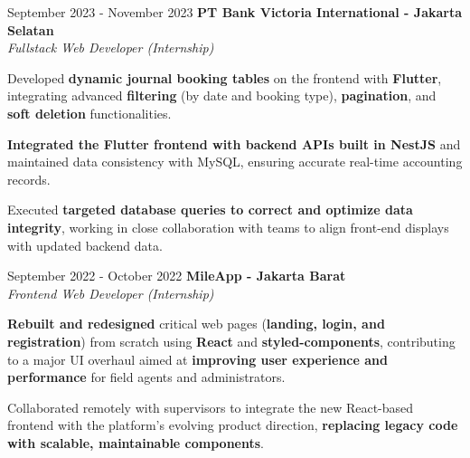 \documentclass[../main.tex]{subfiles}
\begin{document}
\vspace{0.40 cm}

\begin{twocolentry}{September 2023 - November 2023}
    \textbf{PT Bank Victoria International \color{Gray}- Jakarta Selatan}\\
    \textit{Fullstack Web Developer (Internship)}
\end{twocolentry}

\vspace{0.10 cm}
\begin{onecolentry}
\begin{highlights}
    \item Developed \textbf{dynamic journal booking tables} on the frontend with \textbf{Flutter}, integrating advanced \textbf{filtering} (by date and booking type), \textbf{pagination}, and \textbf{soft deletion} functionalities.
    \item \textbf{Integrated the Flutter frontend with backend APIs built in NestJS} and maintained data consistency with MySQL, ensuring accurate real-time accounting records.
    \item Executed \textbf{targeted database queries to correct and optimize data integrity}, working in close collaboration with teams to align front-end displays with updated backend data.
\end{highlights}
\end{onecolentry}

\vspace{0.40 cm}

\begin{twocolentry}{September 2022 - October 2022}
    \textbf{MileApp \color{Gray}- Jakarta Barat}\\
    \textit{Frontend Web Developer (Internship)}
\end{twocolentry}

\vspace{0.10 cm}
\begin{onecolentry}
\begin{highlights}
    \item \textbf{Rebuilt and redesigned} critical web pages (\textbf{landing, login, and registration}) from scratch using \textbf{React} and \textbf{styled-components}, contributing to a major UI overhaul aimed at \textbf{improving user experience and performance} for field agents and administrators.
    \item Collaborated remotely with supervisors to integrate the new React-based frontend with the platform’s evolving product direction, \textbf{replacing legacy code with scalable, maintainable components}.
\end{highlights}
\end{onecolentry}
\end{document}
